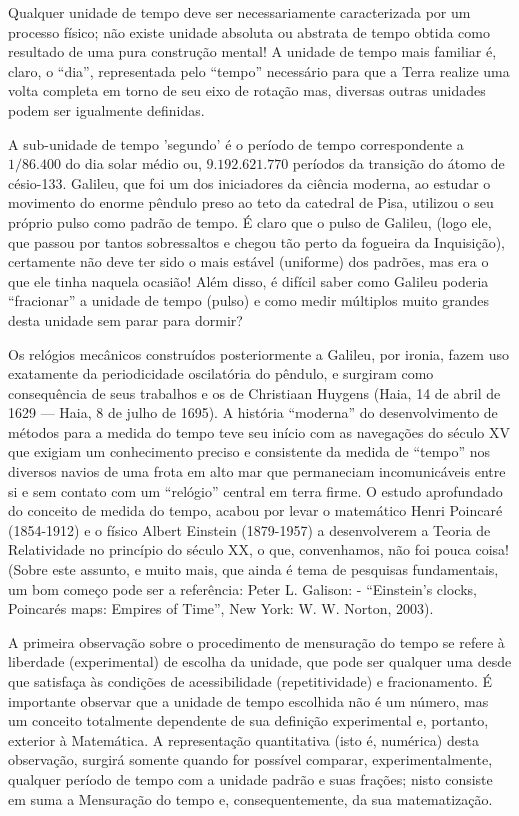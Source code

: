 Qualquer unidade de tempo deve ser necessariamente caracterizada por um processo físico; não existe unidade absoluta ou abstrata de tempo obtida como resultado de uma pura construção mental! A unidade de tempo mais familiar é, claro, o ``dia'', representada pelo ``tempo'' necessário para que a Terra realize uma volta completa em torno de seu eixo de rotação mas, diversas outras unidades podem ser igualmente definidas.

A sub-unidade de tempo 'segundo' é o período de tempo correspondente a \(1/86.400\) do dia solar médio ou, \(9.192.621.770\) períodos da transição do átomo de césio-133. Galileu, que foi um dos iniciadores da ciência moderna, ao estudar o movimento do enorme pêndulo preso ao teto da catedral de Pisa, utilizou o seu próprio pulso como padrão de tempo. É claro que o pulso de Galileu, (logo ele, que passou por tantos sobressaltos e chegou tão perto da fogueira da Inquisição), certamente não deve ter sido o mais estável (uniforme) dos padrões, mas era o que ele tinha naquela ocasião! Além disso, é difícil saber como Galileu poderia ``fracionar'' a unidade de tempo (pulso) e como medir múltiplos muito grandes desta unidade sem parar para dormir?

Os relógios mecânicos construídos posteriormente a Galileu, por ironia, fazem uso exatamente da periodicidade oscilatória do pêndulo, e surgiram como consequência de seus trabalhos e os de Christiaan Huygens (Haia, 14 de abril de 1629 — Haia, 8 de julho de 1695). A história ``moderna'' do desenvolvimento de métodos para a medida do tempo teve seu início com as navegações do século XV que exigiam um conhecimento preciso e consistente da medida de ``tempo'' nos diversos navios de uma frota em alto mar que permaneciam incomunicáveis entre si e sem contato com um ``relógio'' central em terra firme. O estudo aprofundado do conceito de medida do tempo, acabou por levar o matemático Henri Poincaré (1854-1912) e o físico Albert Einstein (1879-1957) a desenvolverem a Teoria de Relatividade no princípio do século XX, o que, convenhamos, não foi pouca coisa! (Sobre este assunto, e muito mais, que ainda é tema de pesquisas fundamentais, um bom começo pode ser a referência: Peter L. Galison: - ``Einstein’s clocks, Poincarés maps: Empires of Time”, New York: W. W. Norton, 2003).

A primeira observação sobre o procedimento de mensuração do tempo se refere à liberdade (experimental) de escolha da unidade, que pode ser qualquer uma desde que satisfaça às condições de acessibilidade (repetitividade) e fracionamento. É importante observar que a unidade de tempo escolhida não é um número, mas um conceito totalmente dependente de sua definição experimental e, portanto, exterior à Matemática. A representação quantitativa (isto é, numérica) desta observação, surgirá somente quando for possível comparar, experimentalmente, qualquer período de tempo com a unidade padrão e suas frações; nisto consiste em suma a Mensuração do tempo e, consequentemente, da sua matematização.

